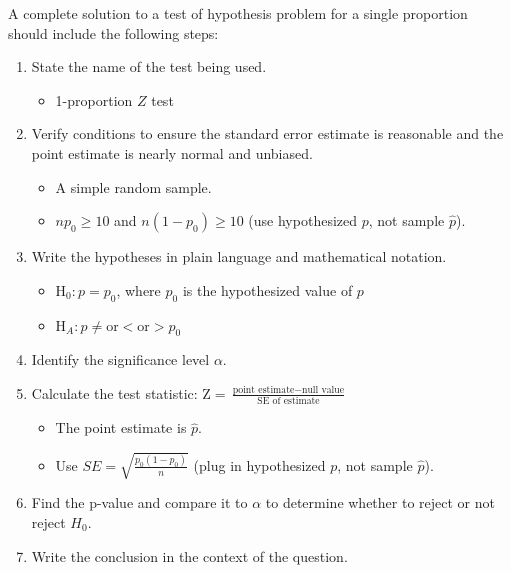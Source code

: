 \begin{termBox}{
A complete solution to a test of hypothesis problem for a single proportion should include the following steps:
\begin{enumerate}
\setlength{\itemsep}{0mm}
\item State the name of the test being used.
\begin{itemize}
\setlength{\itemsep}{0mm}
\item 1-proportion $Z$ test
\end{itemize}
\item Verify conditions to ensure the standard error estimate is reasonable and the point estimate is nearly normal and unbiased.\vspace{-1.5mm}
  \begin{itemize}
  \setlength{\itemsep}{0mm}
  \item A simple random sample.
  \item $np_0\geq10$ and $n(1-p_0)\geq10$ (use hypothesized $p$, not sample $\hat{p}$).
  \end{itemize}
\item Write the hypotheses in plain language and mathematical notation.\vspace{-1.5mm}
  \begin{itemize}
  \setlength{\itemsep}{0mm}
  \item H$_0: p = p_0$, where $p_0$ is the hypothesized value of $p$
  \item H$_A: p \ne \text{or} < \text{or} > p_0$
  \end{itemize}
\item Identify the significance level $\alpha$.
\vspace{-1.5mm}
\item Calculate the test statistic: $\text{Z} = \frac{\text{point estimate} - \text{null value}}{\text{SE of estimate}}$
  \begin{itemize}
  \item The point estimate is $\hat{p}$.
  \item Use $SE = \sqrt{\frac{p_0(1-p_0)}{n}}$ (plug in hypothesized $p$, not sample $\hat{p}$).
  \end{itemize}
\item Find the p-value and compare it to $\alpha$ to determine whether to reject or not reject $H_0$.
\item Write the conclusion in the context of the question.
\end{enumerate}}
\end{termBox}

